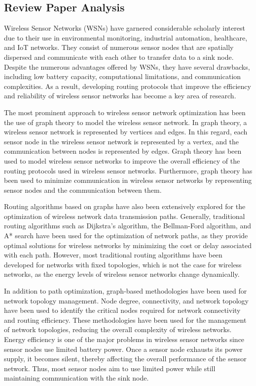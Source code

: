 \documentclass[a4paper,fleqn]{cas-dc}
\numberwithin{equation}{section}
\begin{document}
\subsection{Review Paper Analysis}

Wireless Sensor Networks (WSNs) have garnered considerable scholarly interest due to their use in environmental monitoring, industrial automation, healthcare, and IoT networks. They consist of numerous sensor nodes that are spatially dispersed and communicate with each other to transfer data to a sink node. Despite the numerous advantages offered by WSNs, they have several drawbacks, including low battery capacity, computational limitations, and communication complexities. As a result, developing routing protocols that improve the efficiency and reliability of wireless sensor networks has become a key area of research.

The most prominent approach to wireless sensor network optimization has been the use of graph theory to model the wireless sensor network. In graph theory, a wireless sensor network is represented by vertices and edges. In this regard, each sensor node in the wireless sensor network is represented by a vertex, and the communication between nodes is represented by edges. Graph theory has been used to model wireless sensor networks to improve the overall efficiency of the routing protocols used in wireless sensor networks. Furthermore, graph theory has been used to minimize communication in wireless sensor networks by representing sensor nodes and the communication between them.

Routing algorithms based on graphs have also been extensively explored for the optimization of wireless network data transmission paths. Generally, traditional routing algorithms such as Dijkstra's algorithm, the Bellman-Ford algorithm, and A* search have been used for the optimization of network paths, as they provide optimal solutions for wireless networks by minimizing the cost or delay associated with each path. However, most traditional routing algorithms have been developed for networks with fixed topologies, which is not the case for wireless networks, as the energy levels of wireless sensor networks change dynamically.

In addition to path optimization, graph-based methodologies have been used for network topology management. Node degree, connectivity, and network topology have been used to identify the critical nodes required for network connectivity and routing efficiency. These methodologies have been used for the management of network topologies, reducing the overall complexity of wireless networks. Energy efficiency is one of the major problems in wireless sensor networks since sensor nodes use limited battery power. Once a sensor node exhausts its power supply, it becomes silent, thereby affecting the overall performance of the sensor network. Thus, most sensor nodes aim to use limited power while still maintaining communication with the sink node.
\end{document}
